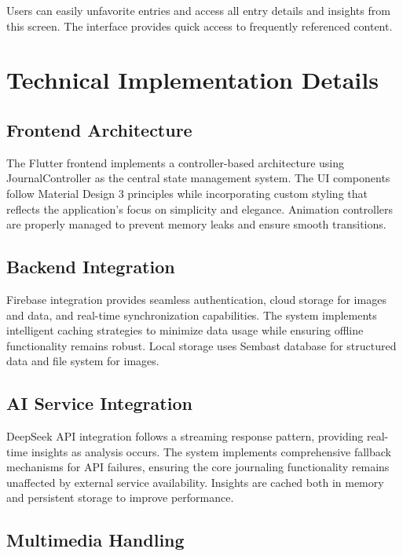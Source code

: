 Users can easily unfavorite entries and access all entry details and insights from this screen. The interface provides quick access to frequently referenced content.

\section{Technical Implementation Details}

\subsection{Frontend Architecture}

The Flutter frontend implements a controller-based architecture using JournalController as the central state management system. The UI components follow Material Design 3 principles while incorporating custom styling that reflects the application's focus on simplicity and elegance. Animation controllers are properly managed to prevent memory leaks and ensure smooth transitions.

\subsection{Backend Integration}

Firebase integration provides seamless authentication, cloud storage for images and data, and real-time synchronization capabilities. The system implements intelligent caching strategies to minimize data usage while ensuring offline functionality remains robust. Local storage uses Sembast database for structured data and file system for images.

\subsection{AI Service Integration}

DeepSeek API integration follows a streaming response pattern, providing real-time insights as analysis occurs. The system implements comprehensive fallback mechanisms for API failures, ensuring the core journaling functionality remains unaffected by external service availability. Insights are cached both in memory and persistent storage to improve performance.

\subsection{Multimedia Handling}

